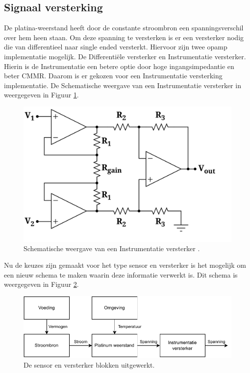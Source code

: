 \subsection{Signaal versterking}
De platina-weerstand heeft door de constante stroombron een spanningsverschil over hem heen staan. Om deze spanning te versterken is er een versterker nodig die van differentieel naar single ended  versterkt. Hiervoor zijn twee opamp implementatie mogelijk. De Differentiële versterker en Instrumentatie versterker. Hierin is de Instrumentatie een betere optie door hoge ingangsimpedantie en beter CMMR. Daarom is er gekozen voor een Instrumentatie versterking implementatie. De Schematische weergave van een Instrumentatie versterker in weergegeven in Figuur \ref{fig:instrumentatie_versterker_schematic}.

\begin{figure}[H]
    \centering
    \includegraphics[width=0.5\linewidth]{pictures/instrumentatie_versterk.png}
    \caption{Schematische weergave van een Instrumentatie versterker \cite{Instrumentatie_versterker_schematic}.}
    \label{fig:instrumentatie_versterker_schematic}
\end{figure}

Nu de keuzes zijn gemaakt voor het type sensor en versterker is het mogelijk om een nieuw schema te maken waarin deze informatie verwerkt is. Dit schema is weergegeven in Figuur \ref{fig:Sensor_schematic_circuit_niveau}.

\begin{figure}[H]
    \centering
    \includegraphics[width=0.8\linewidth]{pictures/Circuit_nivea_schema.drawio.pdf}
    \caption{De sensor en versterker blokken uitgewerkt.}
    \label{fig:Sensor_schematic_circuit_niveau}
\end{figure}

